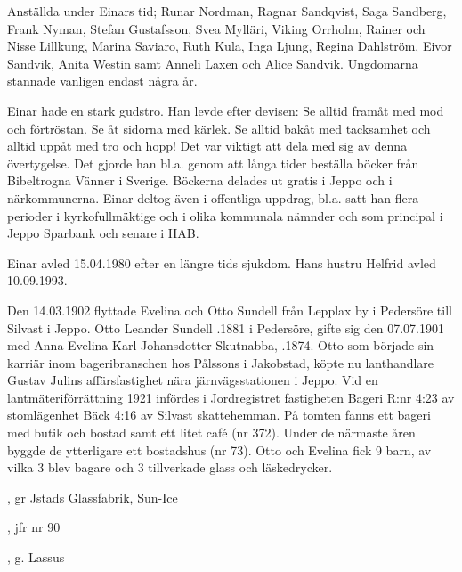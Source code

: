 Anställda under Einars tid; Runar Nordman, Ragnar Sandqvist, Saga Sandberg, Frank Nyman, Stefan Gustafsson, Svea Mylläri, Viking Orrholm, Rainer och Nisse Lillkung, Marina Saviaro, Ruth Kula, Inga Ljung, Regina Dahlström, Eivor Sandvik, Anita Westin samt Anneli Laxen och Alice Sandvik.  Ungdomarna stannade vanligen endast några år.

Einar hade en stark gudstro. Han levde efter devisen: Se alltid framåt med mod och förtröstan. Se åt sidorna med kärlek. Se alltid bakåt med tacksamhet och alltid uppåt med tro och hopp! Det var viktigt att dela med sig av denna övertygelse. Det gjorde han bl.a. genom att långa tider beställa böcker från Bibeltrogna Vänner i Sverige. Böckerna delades ut gratis i Jeppo och i närkommunerna. Einar deltog även i offentliga uppdrag, bl.a. satt han flera perioder i kyrkofullmäktige och i olika kommunala nämnder och som principal i Jeppo Sparbank och senare i HAB.

Einar avled 15.04.1980 efter en längre tids sjukdom. Hans hustru Helfrid avled 10.09.1993.



Den 14.03.1902  flyttade Evelina och Otto Sundell från Lepplax by i Pedersöre till Silvast i Jeppo. Otto Leander Sundell .1881 i Pedersöre, gifte sig den 07.07.1901 med Anna Evelina Karl-Johansdotter Skutnabba, .1874. Otto som började sin karriär inom bageribranschen hos Pålssons i Jakobstad, köpte nu lanthandlare Gustav Julins affärsfastighet nära järnvägsstationen i Jeppo. Vid en lantmäteriförrättning 1921 infördes i Jordregistret fastigheten Bageri R:nr 4:23 av stomlägenhet Bäck 4:16 av Silvast skattehemman. På tomten fanns ett bageri med butik och bostad samt ett litet café (nr 372). Under de närmaste åren byggde de ytterligare ett bostadshus (nr 73). Otto och Evelina fick 9 barn, av vilka 3 blev bagare och 3 tillverkade glass och läskedrycker.
\begin{jhchildren}
  \item {}
  \item {}
  \item {}
  \item {}
  \item {}, gr Jstads Glassfabrik, Sun-Ice
  \item {}
  \item {}, jfr nr 90
  \item {}
  \item {}, g. Lassus
\end{jhchildren}

